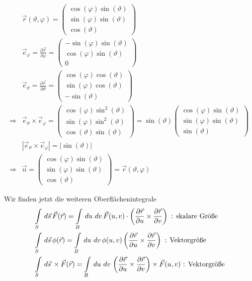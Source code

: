 \begin{Beispiel}[Kugel]
\begin{align*}
&\vec{r}(\vartheta,\varphi) =
\begin{pmatrix}\cos(\varphi)\sin(\vartheta) \\
\sin(\varphi)\sin(\vartheta) \\ \cos(\vartheta)\end{pmatrix}\\
&\vec{e}_\varphi = \frac{\partial \vec{r}}{\partial \varphi} =
\begin{pmatrix}-\sin(\varphi)\sin(\vartheta) \\ \cos(\varphi)\sin(\vartheta) \\
0\end{pmatrix}\\
&\vec{e}_\vartheta = \frac{\partial \vec{r}}{\partial \vartheta} =
\begin{pmatrix}\cos(\varphi)\cos(\vartheta) \\ \sin(\varphi)\cos(\vartheta) \\
-\sin(\vartheta)\end{pmatrix}\\
\Rightarrow & \vec{e}_\vartheta \times \vec{e}_\varphi =
\begin{pmatrix}\cos(\varphi)\sin^2(\vartheta) \\ \sin(\varphi)\sin^2(\vartheta)
\\ \cos(\vartheta)\sin(\vartheta)\end{pmatrix} = \sin(\vartheta) \begin{pmatrix}\cos(\varphi)\sin(\vartheta) \\ \sin(\varphi)\sin(\vartheta)
\\ \sin(\vartheta)\end{pmatrix}\\
&\left| \vec{e}_\vartheta \times \vec{e}_\varphi \right| = |\sin(\vartheta)|\\
\Rightarrow & \vec{n} = \begin{pmatrix}\cos(\varphi)\sin(\vartheta) \\
\sin(\varphi)\sin(\vartheta) \\ \cos(\vartheta)\end{pmatrix} =
\vec{r}(\vartheta, \varphi)
\end{align*}
\end{Beispiel}

Wir finden jetzt die weiteren Oberflächenintegrale
\begin{align*}
&\int \limits_{S} \,d\vec{s}\, \vec{F}(\vec{r}) = \int \limits_{B} \,du\,\,dv\,
\vec{F}(u,v) \cdot \left( \frac{\partial \vec{r}}{\partial u} \times
\frac{\partial \vec{r}}{\partial v}\right) \text{ : skalare Größe}\\
&\int \limits_{S} \,d\vec{s}\, \phi(\vec{r}) = \int \limits_{B} \,du\,\,dv\,
\phi(u,v) \left( \frac{\partial \vec{r}}{\partial u} \times
\frac{\partial \vec{r}}{\partial v}\right) \text{ : Vektorgröße}\\
&\int \limits_{S} \,d\vec{s}\, \times \vec{F}(\vec{r}) = \int \limits_{B} \,du\,\,dv\,
 \left( \frac{\partial \vec{r}}{\partial u} \times
\frac{\partial \vec{r}}{\partial v}\right) \times \vec{F}(u,v) \text{ :
Vektorgröße}\\
\end{align*}

